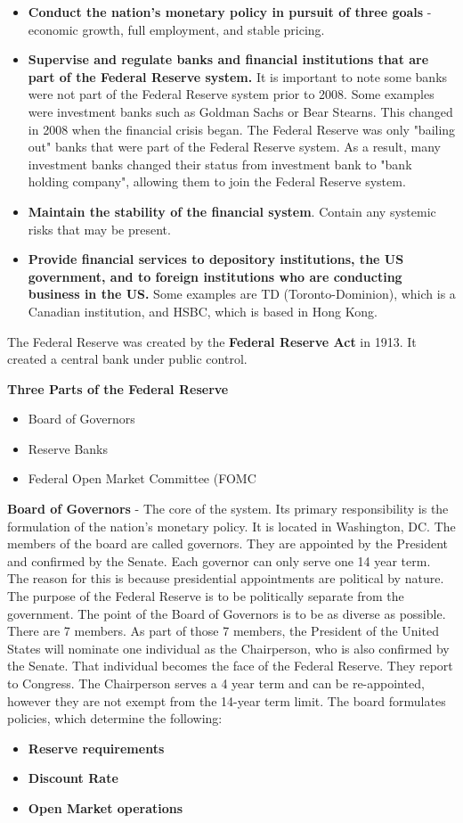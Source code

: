 \documentclass{article}
\begin{document}
\begin{itemize}
    \item{\textbf{Conduct the nation's monetary policy in pursuit of three goals} - economic growth, full employment, and stable pricing.}
    \item{\textbf{Supervise and regulate banks and financial institutions that are part of the Federal Reserve system.} It is important to note some banks were not part of the Federal Reserve system prior to 2008. Some examples were investment banks such as Goldman Sachs or Bear Stearns. This changed in 2008 when the financial crisis began. The Federal Reserve was only "bailing out" banks that were part of the Federal Reserve system. As a result, many investment banks changed their status from investment bank to "bank holding company", allowing them to join the Federal Reserve system.}
    \item{\textbf{Maintain the stability of the financial system}. Contain any systemic risks that may be present.}
    \item{\textbf{Provide financial services to depository institutions, the US government, and to foreign institutions who are conducting business in the US.} Some examples are TD (Toronto-Dominion), which is a Canadian institution, and HSBC, which is based in Hong Kong.}
\end{itemize}

The Federal Reserve was created by the \textbf{Federal Reserve Act} in 1913. It created a central bank under public control.

\textbf{Three Parts of the Federal Reserve}
\begin{itemize}
    \item{Board of Governors}
    \item{Reserve Banks}
    \item{Federal Open Market Committee (FOMC}
\end{itemize}

\textbf{Board of Governors} - The core of the system. Its primary responsibility is the formulation of the nation's monetary policy. It is located in Washington, DC. The members of the board are called governors. They are appointed by the President and confirmed by the Senate. Each governor can only serve one 14 year term. The reason for this is because presidential appointments are political by nature. The purpose of the Federal Reserve is to be politically separate from the government. The point of the Board of Governors is to be as diverse as possible. There are 7 members. As part of those 7 members, the President of the United States will nominate one individual as the Chairperson, who is also confirmed by the Senate. That individual becomes the face of the Federal Reserve. They report to Congress. The Chairperson serves a 4 year term and can be re-appointed, however they are not exempt from the 14-year term limit. The board formulates policies, which determine the following:
\begin{itemize}
    \item{\textbf{Reserve requirements}}
    \item{\textbf{Discount Rate}}
    \item{\textbf{Open Market operations}}
\end{itemize}
\end{document}
